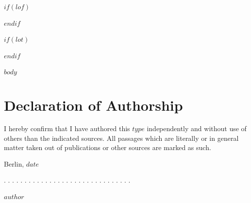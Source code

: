 \documentclass[a4paper,11pt]{article}
\newcommand{\thesistype}{$type$}
\newcommand{\thesisauthor}{$author$}
\newcommand{\thesisdate}{$date$}
\begin{document}
$if(lof)$
\newpage
\listoffigures
{}
$endif$

$if(lot)$
\newpage
\listoftables
{}
$endif$

\newpage
\pagestyle{plain}       
\setcounter{page}{1}    %

$body$




\newpage
\thispagestyle{empty}
\hypertarget{declaration-of-authorship}{%
\section*{Declaration of Authorship}\label{declaration-of-authorship}}

I hereby confirm that I have authored this \thesistype{} independently and
without use of others than the indicated sources. All passages which are
literally or in general matter taken out of publications or other sources are
marked as such.
\vspace{1cm}

Berlin, \thesisdate{}
\vspace{3cm}

. . . . . . . . . . . . . . . . . . . . . . . . . . . . . . .
\vspace{0.1cm}

\thesisauthor{}
\end{document}
